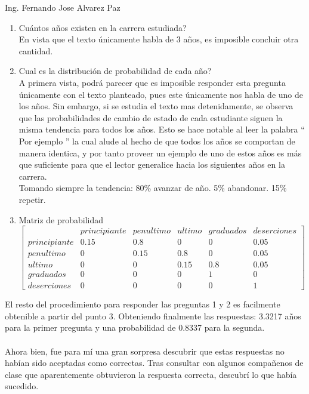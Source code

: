 \documentclass{letter}
\begin{document}
\begin{letter}{Ing. Fernando Jose Alvarez Paz}
  \begin{enumerate}
    \item Cuántos años existen en la carrera estudiada? \\
      En vista que el texto únicamente habla de 3 años, es imposible
      concluir otra cantidad.
    \item Cual es la distribución de probabilidad de cada año? \\
      A primera vista, podrá parecer que es imposible responder 
      esta pregunta únicamente con el texto planteado, pues este 
      únicamente nos habla de uno de los años. Sin embargo, si se estudia
      el texto mas detenidamente, se observa que las probabilidades 
      de cambio de estado de cada estudiante siguen la misma tendencia
      para todos los años. Esto se 
      hace notable al leer la palabra `` Por ejemplo '' la cual 
      alude al hecho de que todos los años se comportan de manera 
      identica, y por tanto proveer un ejemplo de uno de estos años
      es más que suficiente para que el lector generalice hacia los 
      siguientes años en la carrera.\\ 
      Tomando siempre la tendencia: 80\% avanzar de año. 5\% abandonar. 
      15\% repetir.
    \item Matriz de probabilidad \\
      $\left[\begin{matrix}  & principiante & penultimo & ultimo & graduados & deserciones
      \\principiante & 0.15 & 0.8 & 0 & 0 & 0.05\\penultimo & 0 & 0.15 & 0.8 & 0 & 0.05
      \\ultimo & 0 & 0 & 0.15 & 0.8 & 0.05\\graduados & 0 & 0 & 0 & 1 & 0
      \\deserciones & 0 & 0 & 0 & 0 & 1\end{matrix}\right]$
  \end{enumerate}
  El resto del procedimiento para responder las preguntas 1 y 2 es 
  facilmente obtenible a partir del punto 3. Obteniendo finalmente 
  las respuestas: 
  3.3217 años para la primer pregunta y una probabilidad de 
  0.8337 para la segunda. \\\\ 
  Ahora bien, fue para mí una gran sorpresa descubrir que estas 
  respuestas no habían sido aceptadas como correctas. Tras 
  consultar con algunos compañenos de clase que aparentemente 
  obtuvieron la respuesta correcta, descubrí lo que había sucedido.\\

\end{letter}
\end{document}
